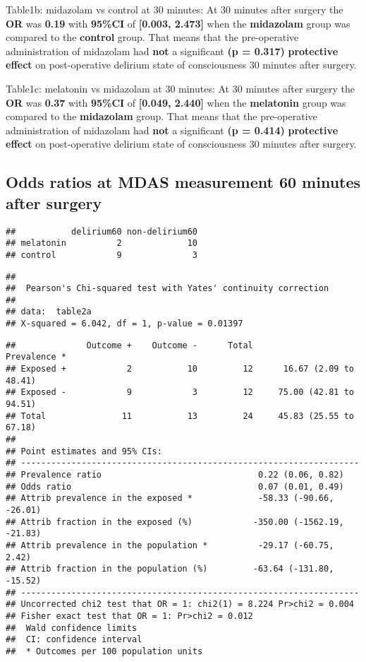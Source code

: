\documentclass[
]{article}
\begin{document}
Table1b: midazolam vs control at 30 minutes: At 30 minutes after surgery
the \textbf{OR} was \textbf{0.19} with \textbf{95\%CI} of
\textbf{{[}0.003, 2.473{]}} when the \textbf{midazolam} group was
compared to the \textbf{control} group. That means that the
pre-operative administration of midazolam had \textbf{not} a significant
\textbf{(p = 0.317)} \textbf{protective effect} on post-operative
delirium state of consciousness 30 minutes after surgery.

Table1c: melatonin vs midazolam at 30 minutes: At 30 minutes after
surgery the \textbf{OR} was \textbf{0.37} with \textbf{95\%CI} of
\textbf{{[}0.049, 2.440{]}} when the \textbf{melatonin} group was
compared to the \textbf{midazolam} group. That means that the
pre-operative administration of midazolam had \textbf{not} a significant
\textbf{(p = 0.414)} \textbf{protective effect} on post-operative
delirium state of consciousness 30 minutes after surgery.

\hypertarget{odds-ratios-at-mdas-measurement-60-minutes-after-surgery}{%
\subsection{Odds ratios at MDAS measurement 60 minutes after
surgery}\label{odds-ratios-at-mdas-measurement-60-minutes-after-surgery}}

\begin{verbatim}
##           delirium60 non-delirium60
## melatonin          2             10
## control            9              3
\end{verbatim}

\begin{verbatim}
## 
##  Pearson's Chi-squared test with Yates' continuity correction
## 
## data:  table2a
## X-squared = 6.042, df = 1, p-value = 0.01397
\end{verbatim}

\begin{verbatim}
##              Outcome +    Outcome -      Total               Prevalence *
## Exposed +            2           10         12      16.67 (2.09 to 48.41)
## Exposed -            9            3         12     75.00 (42.81 to 94.51)
## Total               11           13         24     45.83 (25.55 to 67.18)
## 
## Point estimates and 95% CIs:
## -------------------------------------------------------------------
## Prevalence ratio                               0.22 (0.06, 0.82)
## Odds ratio                                     0.07 (0.01, 0.49)
## Attrib prevalence in the exposed *             -58.33 (-90.66, -26.01)
## Attrib fraction in the exposed (%)            -350.00 (-1562.19, -21.83)
## Attrib prevalence in the population *          -29.17 (-60.75, 2.42)
## Attrib fraction in the population (%)         -63.64 (-131.80, -15.52)
## -------------------------------------------------------------------
## Uncorrected chi2 test that OR = 1: chi2(1) = 8.224 Pr>chi2 = 0.004
## Fisher exact test that OR = 1: Pr>chi2 = 0.012
##  Wald confidence limits
##  CI: confidence interval
##  * Outcomes per 100 population units
\end{verbatim}
\end{document}
